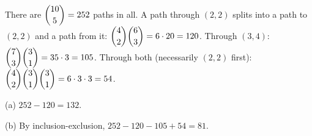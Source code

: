 There are $\dbinom{10}5=252$ paths in all. A path through $(2,2)$ splits into a path to $(2,2)$ and a path from it: $\dbinom42\dbinom63=6\cdot20=120$. Through $(3,4)$: $\dbinom73\dbinom31=35\cdot3=105$. Through both (necessarily $(2,2)$ first): $\dbinom42\dbinom31\dbinom31=6\cdot3\cdot3=54$.

(a) $252-120=\boxed{132}$.

(b) By inclusion-exclusion, $252-120-105+54=\boxed{81}$.
